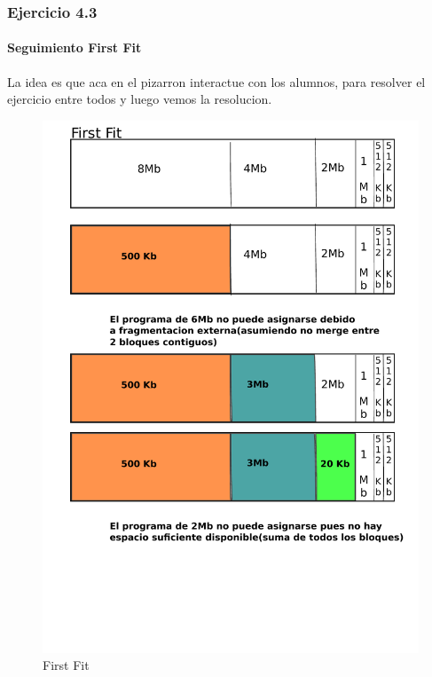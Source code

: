 \documentclass{beamer}
\begin{document}
\begin{frame}
  \frametitle{Ejercicio 4.3}
  \framesubtitle{Seguimiento First Fit}
  La idea es que aca en el pizarron interactue con los alumnos, para resolver el ejercicio entre todos y luego vemos la resolucion.  
   \begin{figure}[h!]
    \centering        
      \includegraphics[scale=0.25]{first-fit.pdf}
    \caption{First Fit}
  \end{figure}
\end{frame}
\end{document}
